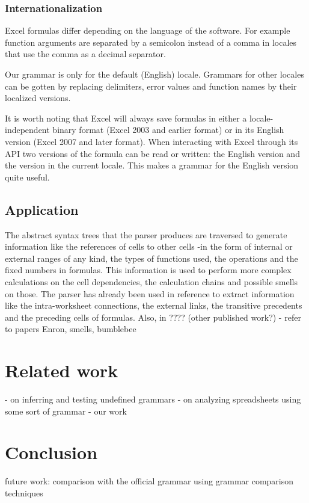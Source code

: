 \documentclass[conference]{IEEEtran}
\begin{document}
\subsubsection{Internationalization}

Excel formulas differ depending on the language of the software. For example function arguments are separated by a semicolon instead of a comma in locales that use the comma as a decimal separator.

Our grammar is only for the default (English) locale. Grammars for other locales can be gotten by replacing delimiters, error values and function names by their localized versions.

It is worth noting that Excel will always save formulas in either a locale-independent binary format (Excel 2003 and earlier format) or in its English version (Excel 2007 and later format). When interacting with Excel through its API two versions of the formula can be read or written: the English version and the version in the current locale.
This makes a grammar for the English version quite useful.

\subsection{Application}
The abstract syntax trees that the parser produces are traversed to generate information like the references of cells to other cells -in the form of internal or external ranges of any kind, the types of functions used, the operations and the fixed numbers in formulas. This information is used to perform more complex calculations on the cell dependencies, the calculation chains and possible smells on those. The parser has already been used in reference \cite{EnronVSEuses} to extract information like the intra-worksheet connections, the external links, the transitive precedents and the preceding cells of formulas. Also, in ???? (other published work?) - refer to papers Enron, smells, bumblebee

\section{Related work}
\label{section:relatedWork}
- on inferring and testing undefined grammars
- on analyzing spreadsheets using some sort of grammar
- our work

\section{Conclusion}
\label{section:conclusion}
future work:
comparison with the official grammar using grammar comparison techniques



\end{document}
